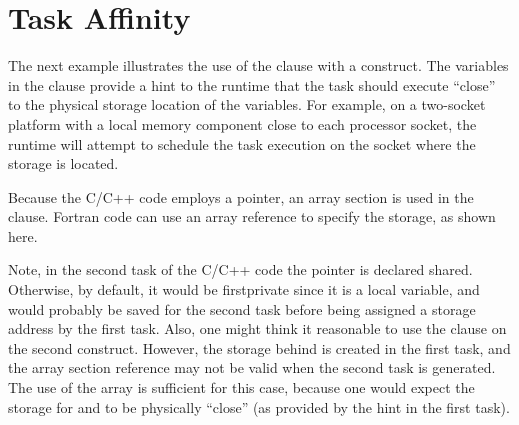 \section{Task Affinity}
\label{sec: task_affinity}

The next example illustrates the use of the 
clause with a  construct.
The variables in the  clause provide a
hint to the runtime that the task should execute
``close'' to the physical storage location of the variables. For example,
on a two-socket platform with a local memory component
close to each processor socket, the runtime will attempt to
schedule the task execution on the socket where the storage is located.

Because the C/C++ code employs a pointer, an array section is used in
the  clause.
Fortran code can use an array reference to specify the storage, as
shown here.

Note, in the second task of the C/C++ code the  pointer is declared
shared.  Otherwise, by default, it would be firstprivate since it is a local
variable, and would probably be saved for the second task before being assigned
a storage address by the first task.  Also, one might think it reasonable to use
the  clause  on the second  construct.
However, the storage behind  is created in the first task, and the 
array section reference may not be valid when the second task is generated.
The use of the  array is sufficient for this case, because one
would expect the storage for  and  to be physically ``close''
(as provided by the hint in the first task).



